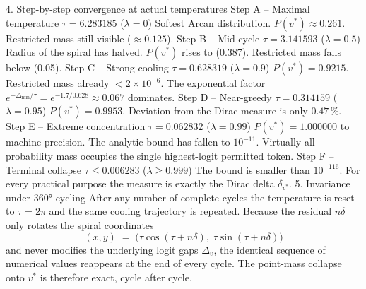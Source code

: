 4. Step-by-step convergence at actual temperatures
Step A – Maximal temperature \(\tau=6.283185\) (\(\lambda=0\))
Softest Arcan distribution. \(P(v^*)\approx0.261\). Restricted mass still visible (\(\approx0.125\)).
Step B – Mid-cycle \(\tau=3.141593\) (\(\lambda=0.5\))
Radius of the spiral has halved. \(P(v^*)\) rises to (0.387). Restricted mass falls below (0.05).
Step C – Strong cooling \(\tau=0.628319\) (\(\lambda=0.9\))
\(P(v^*)=0.9215\). Restricted mass already \(<2\times10^{-6}\). The exponential factor \(e^{-\Delta_{\min}/\tau}=e^{-1.7/0.628}\approx0.067\) dominates.
Step D – Near-greedy \(\tau=0.314159\) (\(\lambda=0.95\))
\(P(v^*)=0.9953\). Deviation from the Dirac measure is only \(0.47\,\%\).
Step E – Extreme concentration \(\tau=0.062832\) (\(\lambda=0.99\))
\(P(v^*)=1.000000\) to machine precision. The analytic bound has fallen to \(10^{-11}\). Virtually all probability mass occupies the single highest-logit permitted token.
Step F – Terminal collapse \(\tau\le0.006283\) (\(\lambda\ge0.999\))
The bound is smaller than \(10^{-116}\). For every practical purpose the measure is exactly the Dirac delta \(\delta_{v^*}\).
5. Invariance under 360° cycling
After any number of complete cycles the temperature is reset to \(\tau=2\pi\) and the same cooling trajectory is repeated. Because the residual \(n\delta\) only rotates the spiral coordinates
\[
(x,y)\;=\;\bigl(\tau\cos(\tau+n\delta),\;\tau\sin(\tau+n\delta)\bigr)
\]
and never modifies the underlying logit gaps \(\Delta_v\), the identical sequence of numerical values reappears at the end of every cycle. The point-mass collapse onto \(v^*\) is therefore exact, cycle after cycle.

